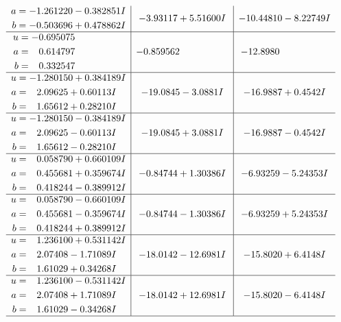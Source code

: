 \documentclass[1p]{elsarticle_modified}
\theoremstyle{definition}
\begin{document}
$$\begin{array}{c|c|c}
\begin{aligned}
a &= -1.261220 - 0.382851 I \\
b &= -0.503696 + 0.478862 I\end{aligned}
 & -3.93117 + 5.51600 I & -10.44810 - 8.22749 I \\ \hline\begin{aligned}
u &= -0.695075\phantom{ +0.000000I} \\
a &= \phantom{-}0.614797\phantom{ +0.000000I} \\
b &= \phantom{-}0.332547\phantom{ +0.000000I}\end{aligned}
 & -0.859562\phantom{ +0.000000I} & -12.8980\phantom{ +0.000000I} \\ \hline\begin{aligned}
u &= -1.280150 + 0.384189 I \\
a &= \phantom{-}2.09625 + 0.60113 I \\
b &= \phantom{-}1.65612 + 0.28210 I\end{aligned}
 & -19.0845 - 3.0881 I & -16.9887 + 0.4542 I \\ \hline\begin{aligned}
u &= -1.280150 - 0.384189 I \\
a &= \phantom{-}2.09625 - 0.60113 I \\
b &= \phantom{-}1.65612 - 0.28210 I\end{aligned}
 & -19.0845 + 3.0881 I & -16.9887 - 0.4542 I \\ \hline\begin{aligned}
u &= \phantom{-}0.058790 + 0.660109 I \\
a &= \phantom{-}0.455681 + 0.359674 I \\
b &= \phantom{-}0.418244 - 0.389912 I\end{aligned}
 & -0.84744 + 1.30386 I & -6.93259 - 5.24353 I \\ \hline\begin{aligned}
u &= \phantom{-}0.058790 - 0.660109 I \\
a &= \phantom{-}0.455681 - 0.359674 I \\
b &= \phantom{-}0.418244 + 0.389912 I\end{aligned}
 & -0.84744 - 1.30386 I & -6.93259 + 5.24353 I \\ \hline\begin{aligned}
u &= \phantom{-}1.236100 + 0.531142 I \\
a &= \phantom{-}2.07408 - 1.71089 I \\
b &= \phantom{-}1.61029 + 0.34268 I\end{aligned}
 & -18.0142 - 12.6981 I & -15.8020 + 6.4148 I \\ \hline\begin{aligned}
u &= \phantom{-}1.236100 - 0.531142 I \\
a &= \phantom{-}2.07408 + 1.71089 I \\
b &= \phantom{-}1.61029 - 0.34268 I\end{aligned}
 & -18.0142 + 12.6981 I & -15.8020 - 6.4148 I\\
 \hline 
 \end{array}$$\newpage\newpage\renewcommand{\arraystretch}{1}
\end{document}
